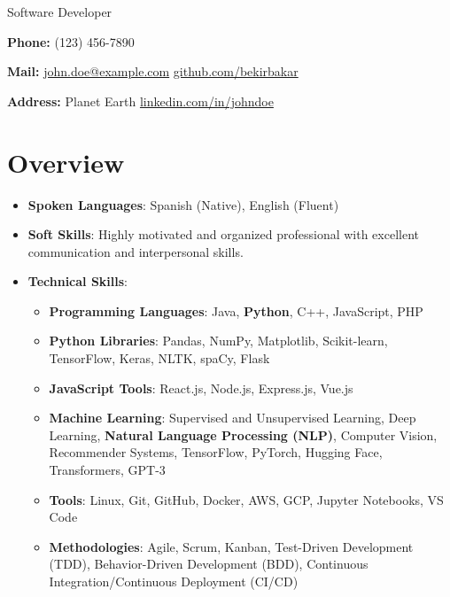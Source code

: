 \documentclass[a4paper,10pt]{article} %
\begin{document}

\noindent Software Developer

\bigbreak

\noindent \textbf{Phone:} (123) 456-7890

\noindent \textbf{Mail:} \href{mailto:john.doe@example.com}{john.doe@example.com} \hfill \href{https://github.com/bekirbakar}{github.com/bekirbakar}

\noindent \textbf{Address:} Planet Earth \hfill \href{https://linkedin.com/in/johndoe}{linkedin.com/in/johndoe}

\section*{Overview}

\begin{itemize}[leftmargin=*]
    \item \textbf{Spoken Languages}: Spanish (Native), English (Fluent)
    \item \textbf{Soft Skills}: Highly motivated and organized professional with excellent communication and interpersonal skills.
    \item \textbf{Technical Skills}:
          \begin{itemize}
              \item[\textbullet] \textbf{Programming Languages}: Java, {\large \textbf{Python}}, C++, JavaScript, PHP
              \item[\textbullet] \textbf{Python Libraries}: Pandas, NumPy, Matplotlib, Scikit-learn, TensorFlow, Keras, NLTK, spaCy, Flask
              \item[\textbullet] \textbf{JavaScript Tools}: React.js, Node.js, Express.js, Vue.js
              \item[\textbullet] \textbf{Machine Learning}: Supervised and Unsupervised Learning, Deep Learning, \textbf{Natural Language Processing (NLP)}, Computer Vision, Recommender Systems, TensorFlow, PyTorch, Hugging Face, Transformers, GPT-3
              \item[\textbullet] \textbf{Tools}: Linux, Git, GitHub, Docker, AWS, GCP, Jupyter Notebooks, VS Code
              \item[\textbullet] \textbf{Methodologies}: Agile, Scrum, Kanban, Test-Driven Development (TDD), Behavior-Driven Development (BDD), Continuous Integration/Continuous Deployment (CI/CD)
          \end{itemize}
\end{itemize}
\end{document}
